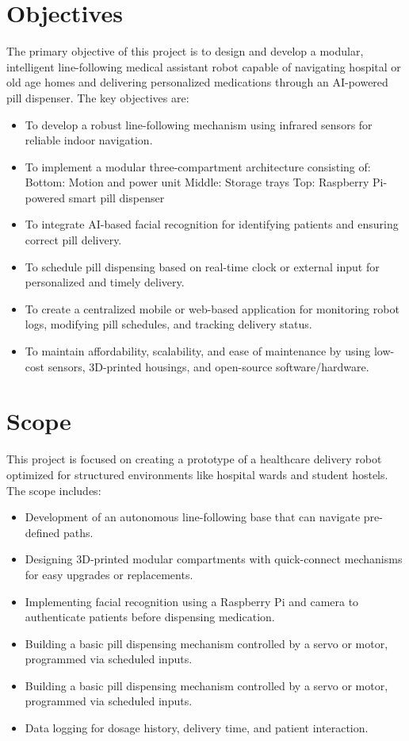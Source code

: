 \section{Objectives}
The primary objective of this project is to design and develop a modular, intelligent line-following medical assistant robot capable of navigating hospital or old age homes and delivering personalized medications through an AI-powered pill dispenser. The key objectives are:
\begin{itemize}
    
    \item To develop a robust line-following mechanism using infrared sensors for reliable indoor navigation.
    \item To implement a modular three-compartment architecture consisting of:
    \subitem Bottom: Motion and power unit
    \subitem Middle: Storage trays
    \subitem Top: Raspberry Pi-powered smart pill dispenser
    \item To integrate AI-based facial recognition for identifying patients and ensuring correct pill delivery.
    \item To schedule pill dispensing based on real-time clock or external input for personalized and timely delivery.
    \item To create a centralized mobile or web-based application for monitoring robot logs, modifying pill schedules, and tracking delivery status.
    \item To maintain affordability, scalability, and ease of maintenance by using low-cost sensors, 3D-printed housings, and open-source software/hardware.
\end{itemize}

\vspace{1.5\baselineskip} 

\section{Scope}
This project is focused on creating a prototype of a healthcare delivery robot optimized for structured environments like hospital wards and student hostels. The scope includes:
\begin{itemize}
    \item Development of an autonomous line-following base that can navigate pre-defined paths.
    \item Designing 3D-printed modular compartments with quick-connect mechanisms for easy upgrades or replacements.
    \item Implementing facial recognition using a Raspberry Pi and camera to authenticate patients before dispensing medication.
    \item Building a basic pill dispensing mechanism controlled by a servo or motor, programmed via scheduled inputs.
    \item Building a basic pill dispensing mechanism controlled by a servo or motor, programmed via scheduled inputs.
    \item Data logging for dosage history, delivery time, and patient interaction.
\end{itemize}
\vspace{1.5\baselineskip}
